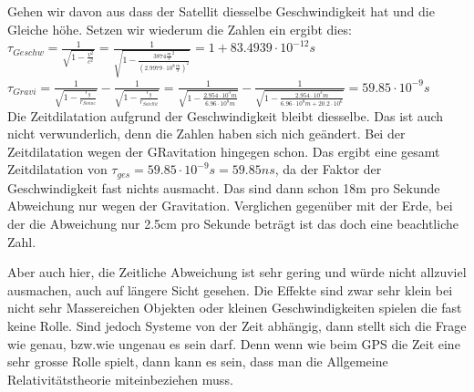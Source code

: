 \begin{refsection}
\noindent{}Gehen wir davon aus dass der Satellit diesselbe Geschwindigkeit hat und die Gleiche höhe. Setzen wir wiederum die Zahlen ein ergibt dies:\\

\( \tau_{Geschw} = \frac{1}{\sqrt{1 - \frac{v^2}{c^2}}} = \frac{1}{\sqrt{1 - \frac{3874 \frac{m}{s}^2}{(2.9979 \cdot 10^8 \frac{m}{s} )^2}}} = 1 + 83.4939 \cdot 10^{-12}s \) \\

\( \tau_{Gravi} = \frac{1}{\sqrt{1-\frac{r_g}{r_{Sonne}}}} - \frac{1}{\sqrt{1-\frac{r_g}{r_{Satellit}}}} =  
\frac{1}{\sqrt{1-\frac{2.954 \cdot 10^3m}{6.96 \cdot 10^8m}}} - \frac{1}{\sqrt{1-\frac{2.954 \cdot 10^3m}{ 6.96 \cdot 10^8m + 20.2 \cdot 10^6}}} =  59.85 \cdot 10^{-9}s \)\\

\noindent{}Die Zeitdilatation aufgrund der Geschwindigkeit bleibt diesselbe. Das ist auch nicht verwunderlich, denn die Zahlen haben sich nich geändert. Bei der Zeitdilatation wegen der GRavitation hingegen schon. Das ergibt eine gesamt Zeitdilatation von \( \tau_{ges} = 59.85 \cdot 10^{-9}s = 59.85ns \), da der Faktor der Geschwindigkeit fast nichts ausmacht. Das sind dann schon 18m pro Sekunde Abweichung nur wegen der Gravitation. Verglichen gegenüber mit der Erde, bei der die Abweichung nur 2.5cm pro Sekunde beträgt ist das doch eine beachtliche Zahl.

Aber auch hier, die Zeitliche Abweichung ist sehr gering und würde nicht allzuviel ausmachen, auch auf längere Sicht gesehen. Die Effekte sind zwar sehr klein bei nicht sehr Massereichen Objekten oder kleinen Geschwindigkeiten spielen die fast keine Rolle. Sind jedoch Systeme von der Zeit abhängig, dann stellt sich die Frage wie genau, bzw.wie ungenau es sein darf. Denn wenn wie beim GPS die Zeit eine sehr grosse Rolle spielt, dann kann es sein, dass man die Allgemeine Relativitätstheorie miteinbeziehen muss.

\printbibliography[heading=subbibliography]
\end{refsection}
